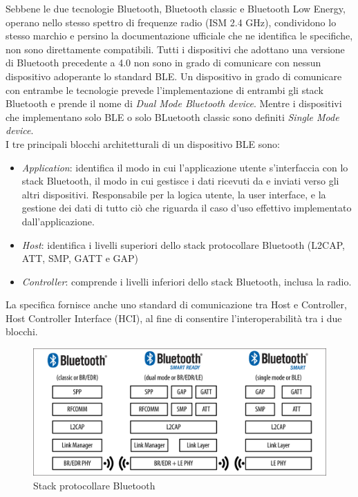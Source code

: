 \noindent Sebbene le due tecnologie Bluetooth, Bluetooth classic e Bluetooth Low Energy, operano nello stesso spettro di frequenze radio (ISM 2.4 GHz), condividono lo stesso marchio e persino la documentazione ufficiale che ne identifica le specifiche, non sono direttamente compatibili. Tutti i dispositivi che adottano una versione di Bluetooth precedente a 4.0 non sono in grado di comunicare con nessun dispositivo adoperante lo standard BLE. Un dispositivo in grado di comunicare con entrambe le tecnologie prevede l'implementazione di entrambi gli stack Bluetooth e prende il nome di \textit{Dual Mode Bluetooth device}. Mentre i dispositivi che implementano solo BLE o solo BLuetooth classic sono definiti \textit{Single Mode device}.\\
I tre principali blocchi architetturali di un dispositivo BLE sono:
\begin{itemize}
    \item \textit{Application}: identifica il modo in cui l'applicazione utente s'interfaccia con lo stack Bluetooth, il modo in cui gestisce i dati ricevuti da e inviati verso gli altri dispositivi. Responsabile per la logica utente, la user interface, e la gestione dei dati di tutto ciò che riguarda il caso d'uso effettivo implementato dall'applicazione.
    \item \textit{Host}: identifica i livelli superiori dello stack protocollare Bluetooth (L2CAP, ATT, SMP, GATT e GAP)
    \item \textit{Controller}: comprende i livelli inferiori dello stack Bluetooth, inclusa la radio.
\end{itemize}
La specifica fornisce anche uno standard di comunicazione tra Host e Controller, Host Controller Interface (HCI), al fine di consentire l'interoperabilità tra i due blocchi.
\begin{figure}[!ht]
    \centering
    \includegraphics[width = \textwidth]{images/Dual mode bluetooth devices.png}
    \caption{Stack protocollare Bluetooth}
    \label{fig:stack_ble}
\end{figure}

